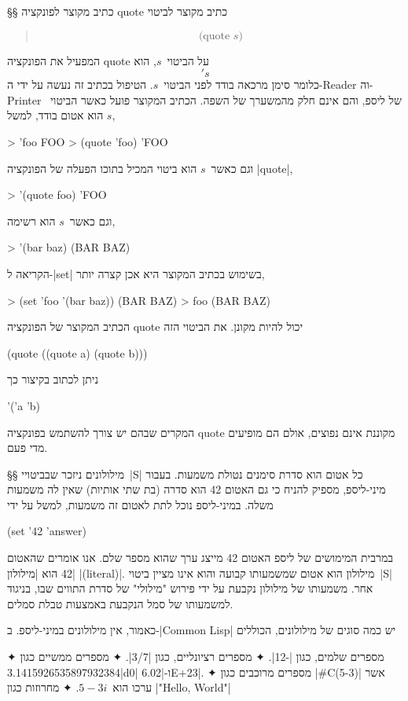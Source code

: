 §§ כתיב מקוצר לפונקציה quote
כתיב מקוצר לביטוי
\begin{quote}
  \setLTR \[
    \text{(quote~$s$)}
\] \end{quote}
המפעיל את הפונקציה quote על הביטוי~$s$, הוא \[
  's
\] כלומר סימן מרכאה בודד
לפני הביטוי~$s$. הטיפול בכתיב זה נעשה על ידי
ה-Reader וה-Printer של ליספ, והם אינם חלק מהמשערך של השפה.
הכתיב המקוצר פועל כאשר הביטוי~$s$ הוא אטום בודד, למשל,
\begin{LISP}
> 'foo
FOO
> (quote 'foo)
'FOO
\end{LISP}
וגם כאשר~$s$ הוא ביטוי המכיל בתוכו הפעלה של הפונקציה \E|quote|,
\begin{LISP}
> '(quote foo)
'FOO
\end{LISP}
וגם כאשר~$s$ הוא רשימה,
\begin{LISP}
> '(bar baz)
(BAR BAZ)
\end{LISP}
הקריאה ל-\E|set| בשימוש בכתיב המקוצר היא אכן קצרה יותר,
\begin{LISP}
> (set 'foo '(bar baz))
(BAR BAZ)
> foo
(BAR BAZ)
\end{LISP}
הכתיב המקוצר של הפונקציה quote יכול להיות מקונן. את הביטוי הזה
\begin{LISP}
(quote ((quote a) (quote b)))
\end{LISP}
ניתן לכתוב בקיצור כך
\begin{LISP}
'('a 'b)
\end{LISP}
המקרים שבהם יש צורך להשתמש בפונקציה quote מקוננת אינם נפוצים, אולם הם מופיעים
מדי פעם.

§§ מילולונים
ניזכר שבביטויי~\E|S| כל אטום הוא סדרת סימנים נטולת משמעות. בעבור מיני-ליספ,
מספיק להניח כי גם האטום 42 הוא סדרה (בת שתי אותיות) שאין לה משמעות משלה.
במיני-ליספ נוכל לתת לאטום זה משמעות, למשל על ידי
\begin{LISP}
(set '42 'answer)
\end{LISP}
במרבית המימושים של ליספ האטום 42 מייצג ערך שהוא מספר
שלם. אנו אומרים שהאטום 42 הוא \ע|מילולון| \E|(literal)|. מילולון הוא
אטום שמשמעותו קבועה והוא אינו מציין ביטוי~\E|S| אחר. משמעותו של מילולון
נקבעת על ידי פירוש "מילולי" של סדרת התווים שבו, בניגוד למשמעותו של סמל
הנקבעת באמצעות טבלת סמלים.

כאמור, אין מילולונים במיני-ליספ. ב-\E|Common Lisp| יש כמה סוגים של מילולונים,
הכוללים
\begin{enumerate}
  ✦ מספרים שלמים, כגון \T|-12|.
  ✦ מספרים רציונליים, כגון \T|3/7|.
  ✦ מספרים ממשיים כגון \T|3.1415926535897932384d0| ו-\T|6.02E+23|.
  ✦ מספרים מרוכבים כגון \T|#C(5-3)| אשר ערכו הוא~$5-3i$.
  ✦ מחרוזות כגון \T|"Hello, World"|
\end{enumerate}

